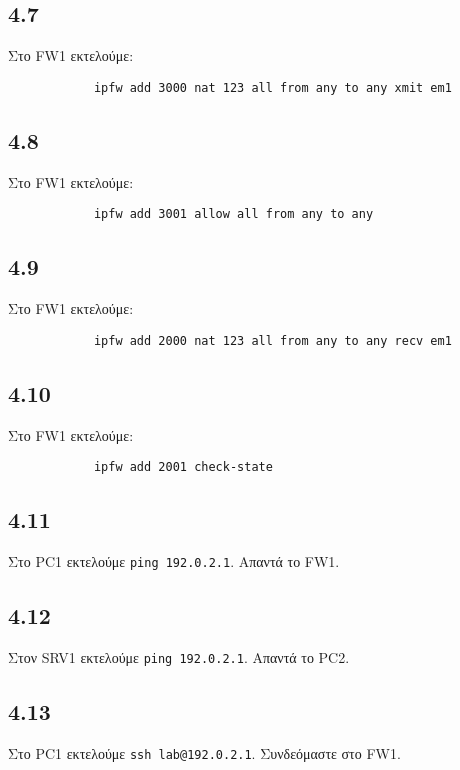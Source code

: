 \documentclass[a4paper, 12pt]{article}
\begin{document}
	\subsection*{4.7}
		Στο FW1 εκτελούμε:
		
		\begin{verbatim}
			ipfw add 3000 nat 123 all from any to any xmit em1 
		\end{verbatim}

	\subsection*{4.8}
		Στο FW1 εκτελούμε:
		
		\begin{verbatim}
			ipfw add 3001 allow all from any to any
		\end{verbatim}

	\subsection*{4.9}
		Στο FW1 εκτελούμε:
		
		\begin{verbatim}
			ipfw add 2000 nat 123 all from any to any recv em1
		\end{verbatim}

	\subsection*{4.10}
		Στο FW1 εκτελούμε:
		
		\begin{verbatim}
			ipfw add 2001 check-state 
		\end{verbatim}

	\subsection*{4.11}
		Στο PC1 εκτελούμε \verb|ping 192.0.2.1|. Απαντά το FW1.

	\subsection*{4.12}
		Στον SRV1 εκτελούμε \verb|ping 192.0.2.1|. Απαντά το PC2.

	\subsection*{4.13}
		Στο PC1 εκτελούμε \verb|ssh lab@192.0.2.1|. Συνδεόμαστε στο FW1.
\end{document}
